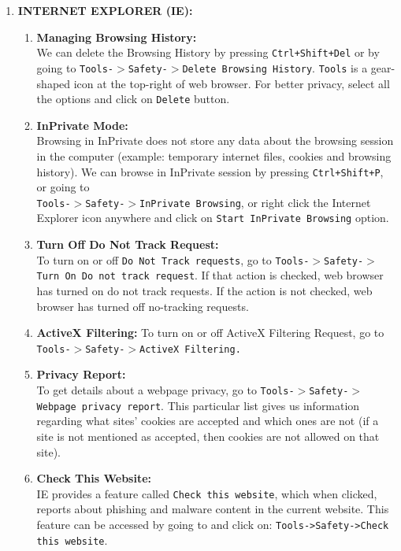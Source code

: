 \documentclass[12pt]{extarticle}
\begin{document}
	\vspace{4mm}
	\noindent
	\begin{enumerate}
	\item	{\large{\textbf{INTERNET EXPLORER (IE):}}}
	
	\begin{enumerate}
		\item \textbf{Managing Browsing History:}\\ We can delete the Browsing History by pressing \texttt{Ctrl+Shift+Del} or by going to \texttt{Tools-$>$Safety-$>$Delete Browsing History}. \texttt{Tools} is a gear-shaped icon at the top-right of web browser. For better privacy, select all the options and click on \texttt{Delete} button.
		
		\item \textbf{InPrivate Mode:}\\ Browsing in InPrivate does not store any data about the browsing session in the computer (example: temporary internet files, cookies and browsing history). We can browse in InPrivate session by pressing \texttt{Ctrl+Shift+P}, or going to\\ \texttt{Tools-$>$Safety-$>$InPrivate Browsing}, or right click the Internet Explorer icon anywhere and click on \texttt{Start InPrivate Browsing} option.
		
		\item \textbf{Turn Off Do Not Track Request:}\\ To turn on or off \texttt{Do Not Track requests}, go to \texttt{Tools-$>$Safety-$>$Turn On Do not track request}. If that action is checked, web browser has turned on do not track requests. If the action is not checked, web browser has turned off no-tracking requests.
		
		\item \textbf{ActiveX Filtering:} To turn on or off ActiveX Filtering Request, go to\\ \texttt{Tools-$>$Safety-$>$ActiveX Filtering.}
		
		
		\item \textbf{Privacy Report:}\\ To get details about a webpage privacy, go to \texttt{Tools-$>$Safety-$>$Webpage privacy report}. This particular list gives us information regarding what sites' cookies are accepted and which ones are not (if a site is not mentioned as accepted, then cookies are not allowed on that site). 
		
		\item \textbf{Check This Website:}\\ IE provides a feature called \texttt{Check this website}, which when clicked, reports about phishing and malware content in the current website. This feature can be accessed by going to and click on: \texttt{Tools->Safety->Check this website}.
		

\end{enumerate}
\end{enumerate}
\end{document}
